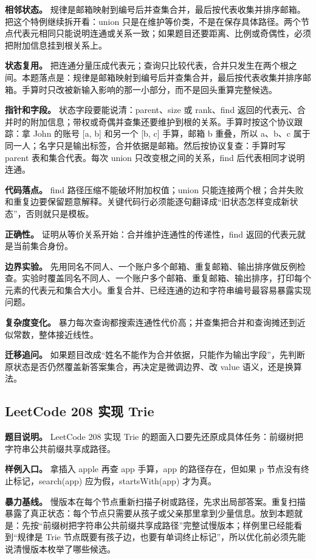\textbf{相邻状态。} 规律是邮箱映射到编号后并查集合并，最后按代表收集并排序邮箱。把这个特例继续拆开看：union 只是在维护等价类，不是在保存具体路径。两个节点代表元相同只能说明连通或关系一致；如果题目还要距离、比例或奇偶性，必须把附加信息挂到根关系上。

\textbf{状态复用。} 把连通分量压成代表元；查询只比较代表，合并只发生在两个根之间。本题落点是：规律是邮箱映射到编号后并查集合并，最后按代表收集并排序邮箱。手算时只改被新输入影响的那一小部分，而不是回头重算完整候选。

\textbf{指针和字段。} 状态字段要能说清：parent、size 或 rank、find 返回的代表元、合并时的附加信息；带权或奇偶并查集还要维护到根的关系。手算时按这个协议跟踪：拿 John 的账号 [a, b] 和另一个 [b, c] 手算，邮箱 b 重叠，所以 a、b、c 属于同一人；名字只是输出标签，合并依据是邮箱。然后按协议复查：手算时写 parent 表和集合代表。每次 union 只改变根之间的关系，find 后代表相同才说明连通。

\textbf{代码落点。} find 路径压缩不能破坏附加权值；union 只能连接两个根；合并失败和重复边要保留题意解释。关键代码行必须能逐句翻译成“旧状态怎样变成新状态”，否则就只是模板。

\textbf{正确性。} 证明从等价关系开始：合并维护连通性的传递性，find 返回的代表元就是当前集合身份。

\textbf{边界实验。} 先用同名不同人、一个账户多个邮箱、重复邮箱、输出排序做反例检查。实验时覆盖同名不同人、一个账户多个邮箱、重复邮箱、输出排序，打印每个元素的代表元和集合大小。重复合并、已经连通的边和字符串编号最容易暴露实现问题。

\textbf{复杂度变化。} 暴力每次查询都搜索连通性代价高；并查集把合并和查询摊还到近似常数，整体接近线性。

\textbf{迁移追问。} 如果题目改成“姓名不能作为合并依据，只能作为输出字段”，先判断原状态是否仍然覆盖新答案集合，再决定是微调边界、改 value 语义，还是换算法。

\subsection{LeetCode 208 实现 Trie}

\textbf{题目说明。} LeetCode 208 实现 Trie 的题面入口要先还原成具体任务：前缀树把字符串公共前缀共享成路径。

\textbf{样例入口。} 拿插入 apple 再查 app 手算，app 的路径存在，但如果 p 节点没有终止标记，search(app) 应为假，startsWith(app) 才为真。

\textbf{暴力基线。} 慢版本在每个节点重新扫描子树或路径，先求出局部答案。重复扫描暴露了真正状态：每个节点只需要从孩子或父亲那里拿到少量信息。放到本题就是：先按“前缀树把字符串公共前缀共享成路径”完整试慢版本；样例里已经能看到“规律是 Trie 节点既要有孩子边，也要有单词终止标记”，所以优化前必须先能说清慢版本枚举了哪些候选。

